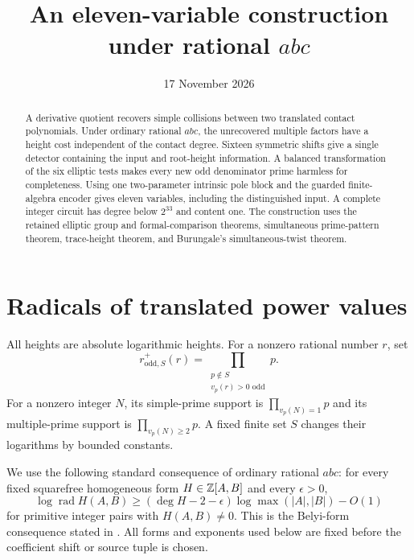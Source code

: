 \documentclass[11pt,a4paper]{article}
\title{An eleven-variable construction under rational \texorpdfstring{$abc$}{abc}}
\author{}\date{17 November 2026}
\DeclareMathOperator{\rad}{rad}\DeclareMathOperator{\Tr}{Tr}
\begin{document}
\maketitle

\begin{abstract}
A derivative quotient recovers simple collisions between two translated
contact polynomials. Under ordinary rational $abc$, the unrecovered
multiple factors have a height cost independent of the contact degree.
Sixteen symmetric shifts give a single detector containing the input and
root-height information. A balanced transformation of the six elliptic
tests makes every new odd denominator prime harmless for completeness.
Using one two-parameter intrinsic pole block and the guarded finite-algebra
encoder gives eleven variables, including the distinguished input.
A complete integer circuit has degree below $2^{33}$ and content one.
The construction uses the retained elliptic group and formal-comparison
theorems, simultaneous prime-pattern theorem, trace-height theorem, and
Burungale's simultaneous-twist theorem.
\end{abstract}

\section{Radicals of translated power values}

All heights are absolute logarithmic heights. For a nonzero rational
number $r$, set
\[
 r^+_{\mathrm{odd},S}(r)=
 \prod_{\substack{p\notin S\\v_p(r)>0\text{ odd}}}p.
\]
For a nonzero integer $N$, its simple-prime support is
$\prod_{v_p(N)=1}p$ and its multiple-prime support is
$\prod_{v_p(N)\ge2}p$. A fixed finite set $S$ changes their logarithms
by bounded constants.

We use the following standard consequence of ordinary rational $abc$:
for every fixed squarefree homogeneous form $H\in\mathbb Z[A,B]$ and every
$\epsilon>0$,
\begin{equation}\label{eq:polyabc}
 \log\rad H(A,B)\ge(\deg H-2-\epsilon)\log\max(|A|,|B|)-O(1)
\end{equation}
for primitive integer pairs with $H(A,B)\ne0$.
This is the Belyi-form consequence stated in
\cite[Appendix A.2, equation (A.2)]{RSZ}.
All forms and exponents used below are fixed before the coefficient
shift or source tuple is chosen.
\end{document}
